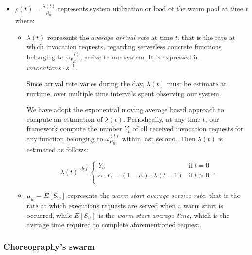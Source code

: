 \documentclass[12pt,a4paper]{report}
\newcommand{\mathDef}{\overset{\textit{def}}{=}}
\begin{document}
\begin{itemize}
	
	\item $\displaystyle \rho(t) = \frac{\lambda(t)}{\mu_{w}}$ represents system utilization or load of the warm pool at time $t$ where:
	
	\begin{itemize}
		
		\item $\lambda(t)$ represents the \textit{average arrival rate} at time $t$, that is the rate at which invocation requests, regarding serverless concrete functions belonging to $\omega_{P_R}^{(l)}$, arrive to our system. It is expressed in $invocations \cdot s^{-1}$.
				
		Since arrival rate varies during the day, $\lambda(t)$ must be estimate at runtime, over multiple time intervals spent observing our system.
		
		We have adopt the exponential moving average based approach to compute an estimation of $\lambda(t)$. Periodically, at any time $t$, our framework compute the number $Y_t$ of all received invocation requests for any function belonging to $\omega_{P_R}^{(l)}$ within last second. Then $\lambda(t)$ is estimated as follows:
		
		\begin{equation}
			\lambda(t) \mathDef
			\begin{cases}
				Y_o & \text{if}\ t = 0\\ 
				\alpha \cdot Y_t + (1 - \alpha) \cdot \lambda(t-1) & \text{if}\ t > 0\\
				
			\end{cases}\,.
		\end{equation}
		
		\item $\mu_{w} = E[S_w]$ represents the \textit{warm start average service rate}, that is the rate at which executions requests are served when a warm start is occurred, while $E[S_w]$ is the \textit{warm start average time}, which is the average time required to complete aforementioned request.
		
	\end{itemize}
	
\end{itemize}

\subsubsection{Choreography's swarm}
\end{document}
